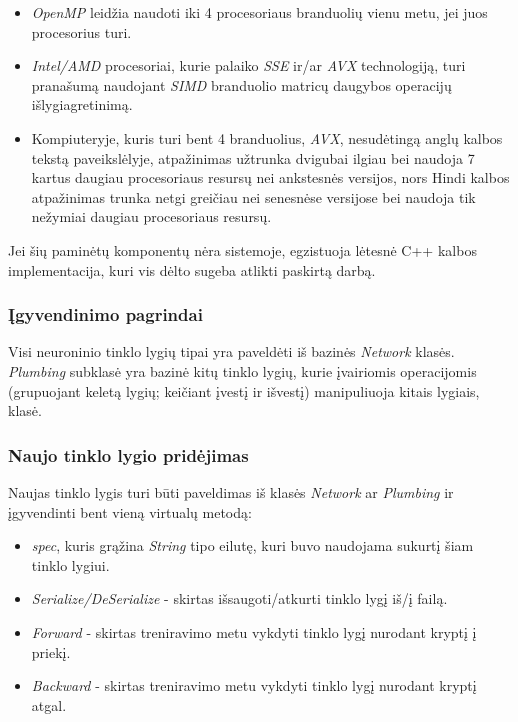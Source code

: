 \documentclass{VUMIFInfBakalaurinis}
\begin{document}
\begin{itemize}
  \item \textit{OpenMP} leidžia naudoti iki 4 procesoriaus branduolių vienu metu, jei juos procesorius turi.
  \item \textit{Intel/AMD} procesoriai, kurie palaiko \textit{SSE} ir/ar \textit{AVX} technologiją, turi pranašumą naudojant \textit{SIMD} branduolio matricų daugybos operacijų išlygiagretinimą.
  \item Kompiuteryje, kuris turi bent 4 branduolius, \textit{AVX}, nesudėtingą anglų kalbos tekstą paveikslėlyje, atpažinimas užtrunka dvigubai ilgiau bei naudoja 7 kartus daugiau procesoriaus resursų nei ankstesnės versijos, nors Hindi kalbos atpažinimas trunka netgi greičiau nei senesnėse versijose bei naudoja tik nežymiai daugiau procesoriaus resursų.
\end{itemize}

Jei šių paminėtų komponentų nėra sistemoje, egzistuoja lėtesnė C++ kalbos implementacija, kuri vis dėlto sugeba atlikti paskirtą darbą.

\subsubsection{Įgyvendinimo pagrindai}
Visi neuroninio tinklo lygių tipai yra paveldėti iš bazinės \textit{Network} klasės.
\textit{Plumbing} subklasė yra bazinė kitų tinklo lygių, kurie įvairiomis operacijomis (grupuojant keletą lygių; keičiant įvestį ir išvestį) manipuliuoja kitais lygiais, klasė.

\subsubsection{Naujo tinklo lygio pridėjimas}
Naujas tinklo lygis turi būti paveldimas iš klasės \textit{Network} ar \textit{Plumbing} ir įgyvendinti bent vieną virtualų metodą:

\begin{itemize}
  \item \textit{spec}, kuris grąžina \textit{String} tipo eilutę, kuri buvo naudojama sukurtį šiam tinklo lygiui.
  \item \textit{Serialize/DeSerialize} - skirtas išsaugoti/atkurti tinklo lygį iš/į failą.
  \item \textit{Forward} - skirtas treniravimo metu vykdyti tinklo lygį nurodant kryptį į priekį.
  \item \textit{Backward} - skirtas treniravimo metu vykdyti tinklo lygį nurodant kryptį atgal.
\end{itemize}
\end{document}
